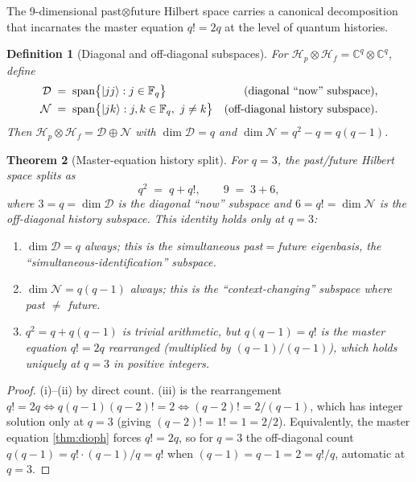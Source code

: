 ﻿\documentclass[12pt]{article}
\newtheorem{theorem}{Theorem}[section]
\newtheorem{definition}[theorem]{Definition}
\newcommand{\CC}{\mathbb{C}}
\newcommand{\GF}[1]{\mathbb{F}_{#1}}
\begin{document}
The 9-dimensional past$\otimes$future Hilbert space carries a canonical
decomposition that incarnates the master equation $q! = 2q$ at the level of
quantum histories.

\begin{definition}[Diagonal and off-diagonal subspaces]\label{def:diag_subspaces}
For $\mathcal H_p\otimes\mathcal H_f = \CC^q\otimes\CC^q$, define
\begin{align}
  \mathcal D &\;=\; \mathrm{span}\bigl\{\ket{jj} : j\in\GF{q}\bigr\}
    & \text{(diagonal ``now'' subspace),}
  \\
  \mathcal N &\;=\; \mathrm{span}\bigl\{\ket{jk} : j,k\in\GF{q},\ j\neq k\bigr\}
    & \text{(off-diagonal history subspace).}
\end{align}
Then $\mathcal H_p\otimes\mathcal H_f = \mathcal D \oplus \mathcal N$ with
$\dim\mathcal D = q$ and $\dim\mathcal N = q^2 - q = q(q-1)$.
\end{definition}

\begin{theorem}[Master-equation history split]\label{thm:masteq_history}
For $q = 3$, the past/future Hilbert space splits as
\begin{equation}
  q^2  \;=\;  q + q!,
  \qquad
  9  \;=\;  3 + 6,
  \label{eq:masteq_history}
\end{equation}
where $3 = q = \dim\mathcal D$ is the diagonal ``now'' subspace and
$6 = q! = \dim\mathcal N$ is the off-diagonal history subspace.  This identity
holds \emph{only} at $q = 3$:
\begin{enumerate}[label=(\roman*),noitemsep]
  \item $\dim\mathcal D = q$ always; this is the simultaneous past$=$future
    eigenbasis, the ``simultaneous-identification'' subspace.
  \item $\dim\mathcal N = q(q-1)$ always; this is the
    ``context-changing'' subspace where past $\neq$ future.
  \item $q^2 = q + q(q-1)$ is trivial arithmetic, but
    $q(q-1) = q!$ is the \emph{master equation $q! = 2q$ rearranged}
    (multiplied by $(q-1)/(q-1)$), which holds uniquely at $q = 3$ in
    positive integers.
\end{enumerate}
\end{theorem}

\begin{proof}
(i)--(ii) by direct count.  (iii) is the rearrangement $q! = 2q \Leftrightarrow
q(q-1)(q-2)! = 2 \Leftrightarrow (q-2)! = 2/(q-1)$, which has integer solution
only at $q=3$ (giving $(q-2)! = 1! = 1 = 2/2$).  Equivalently, the master
equation \cref{thm:dioph} forces $q!=2q$, so for $q=3$ the off-diagonal count
$q(q-1) = q!\cdot(q-1)/q = q!$ when $(q-1) = q-1 = 2 = q!/q$, automatic at
$q=3$.
\end{proof}
\end{document}
